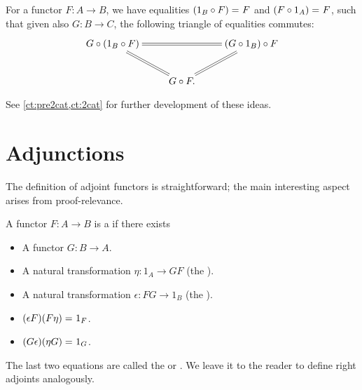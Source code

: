 \begin{lem}\label{ct:units}
  For a functor $F:A\to B$, we have equalities $(1_B\circ F) =_{} F$ and $(F\circ 1_A) =_{} F$, such that given also $G:B\to C$, the following triangle of equalities commutes:
  \[ \xymatrix{
    G\circ (1_B \circ F) \ar@{=}[rr] \ar@{=}[dr] &&
    (G\circ 1_B)\circ F \ar@{=}[dl] \\
    & G \circ F.}
  \]
\end{lem}

See \cref{ct:pre2cat,ct:2cat} for further development of these ideas.


\section{Adjunctions}
\label{sec:adjunctions}

The definition of adjoint functors is straightforward; the main interesting aspect arises from proof-relevance.

\begin{defn}\label{ct:adjoints}
  A functor $F:A\to B$ is a 
  if there exists
  \begin{itemize}
  \item A functor $G:B\to A$.
  \item A natural transformation $\eta:1_A \to GF$ (the ).
  \item A natural transformation $\epsilon:FG\to 1_B$ (the ).
  \item $(\epsilon F)(F\eta) =_{} 1_F$.
  \item $(G\epsilon)(\eta G) =_{} 1_G$.
  \end{itemize}
\end{defn}

The last two equations are called the  or .
We leave it to the reader to define right adjoints analogously.

